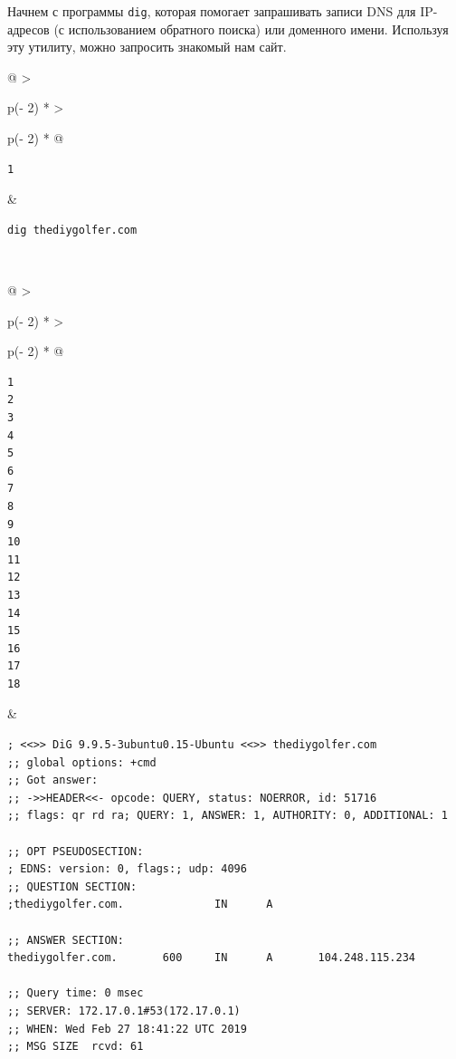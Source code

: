 \documentclass{report}
\begin{document}
Начнем с программы \texttt{dig}, которая помогает запрашивать записи DNS
для IP-адресов (с использованием обратного поиска) или доменного имени.
Используя эту утилиту, можно запросить знакомый нам сайт.

\begin{longtable}[]{@{}
  >{\raggedright\arraybackslash}p{(\columnwidth - 2\tabcolsep) * }
  >{\raggedright\arraybackslash}p{(\columnwidth - 2\tabcolsep) * }@{}}
\toprule
\endhead
\begin{minipage}[t]{\linewidth}\raggedright
\begin{verbatim}
1
\end{verbatim}
\end{minipage} & \begin{minipage}[t]{\linewidth}\raggedright
\begin{verbatim}
dig thediygolfer.com
\end{verbatim}
\end{minipage} \\ \addlinespace
\bottomrule
\end{longtable}

\begin{longtable}[]{@{}
  >{\raggedright\arraybackslash}p{(\columnwidth - 2\tabcolsep) * }
  >{\raggedright\arraybackslash}p{(\columnwidth - 2\tabcolsep) * }@{}}
\toprule
\endhead
\begin{minipage}[t]{\linewidth}\raggedright
\begin{verbatim}
1
2
3
4
5
6
7
8
9
10
11
12
13
14
15
16
17
18
\end{verbatim}
\end{minipage} & \begin{minipage}[t]{\linewidth}\raggedright
\begin{verbatim}
; <<>> DiG 9.9.5-3ubuntu0.15-Ubuntu <<>> thediygolfer.com
;; global options: +cmd
;; Got answer:
;; ->>HEADER<<- opcode: QUERY, status: NOERROR, id: 51716
;; flags: qr rd ra; QUERY: 1, ANSWER: 1, AUTHORITY: 0, ADDITIONAL: 1

;; OPT PSEUDOSECTION:
; EDNS: version: 0, flags:; udp: 4096
;; QUESTION SECTION:
;thediygolfer.com.              IN      A

;; ANSWER SECTION:
thediygolfer.com.       600     IN      A       104.248.115.234

;; Query time: 0 msec
;; SERVER: 172.17.0.1#53(172.17.0.1)
;; WHEN: Wed Feb 27 18:41:22 UTC 2019
;; MSG SIZE  rcvd: 61
\end{verbatim}
\end{minipage} \\ \addlinespace
\bottomrule
\end{longtable}
\end{document}
